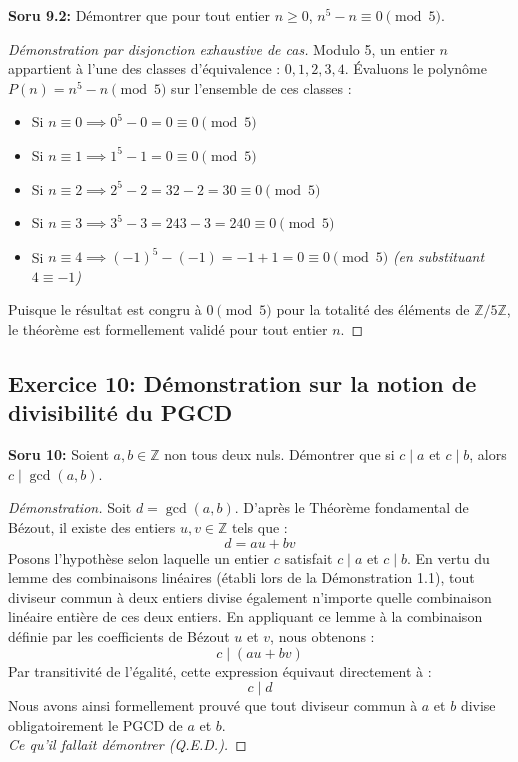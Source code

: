 \documentclass[12pt,a4paper]{report}
\begin{document}
\textbf{Soru 9.2:} Démontrer que pour tout entier $n \geq 0$, $n^5 - n \equiv 0 \pmod{5}$.
\begin{proof}[Démonstration par disjonction exhaustive de cas]
Modulo 5, un entier $n$ appartient à l'une des classes d'équivalence : $0, 1, 2, 3, 4$. 
Évaluons le polynôme $P(n) = n^5 - n \pmod 5$ sur l'ensemble de ces classes :
\begin{itemize}
    \item Si $n \equiv 0 \implies 0^5 - 0 = 0 \equiv 0 \pmod 5$
    \item Si $n \equiv 1 \implies 1^5 - 1 = 0 \equiv 0 \pmod 5$
    \item Si $n \equiv 2 \implies 2^5 - 2 = 32 - 2 = 30 \equiv 0 \pmod 5$
    \item Si $n \equiv 3 \implies 3^5 - 3 = 243 - 3 = 240 \equiv 0 \pmod 5$ 
    \item Si $n \equiv 4 \implies (-1)^5 - (-1) = -1 + 1 = 0 \equiv 0 \pmod 5$ \textit{(en substituant $4 \equiv -1$)}
\end{itemize}
Puisque le résultat est congru à $0 \pmod 5$ pour la totalité des éléments de $\mathbb{Z}/5\mathbb{Z}$, le théorème est formellement validé pour tout entier $n$.
\end{proof}

\subsection*{Exercice 10: Démonstration sur la notion de divisibilité du PGCD}
\textbf{Soru 10:} Soient $a, b \in \mathbb{Z}$ non tous deux nuls. Démontrer que si $c \mid a$ et $c \mid b$, alors $c \mid \gcd(a, b)$.
\begin{proof}[Démonstration]
Soit $d = \gcd(a, b)$. D'après le Théorème fondamental de Bézout, il existe des entiers $u, v \in \mathbb{Z}$ tels que :
\[ d = au + bv \]
Posons l'hypothèse selon laquelle un entier $c$ satisfait $c \mid a$ et $c \mid b$.
En vertu du lemme des combinaisons linéaires (établi lors de la Démonstration 1.1), tout diviseur commun à deux entiers divise également n'importe quelle combinaison linéaire entière de ces deux entiers.
En appliquant ce lemme à la combinaison définie par les coefficients de Bézout $u$ et $v$, nous obtenons :
\[ c \mid (au + bv) \]
Par transitivité de l'égalité, cette expression équivaut directement à :
\[ c \mid d \]
Nous avons ainsi formellement prouvé que tout diviseur commun à $a$ et $b$ divise obligatoirement le PGCD de $a$ et $b$. \\
\textit{Ce qu'il fallait démontrer (Q.E.D.).}
\end{proof}
\end{document}
